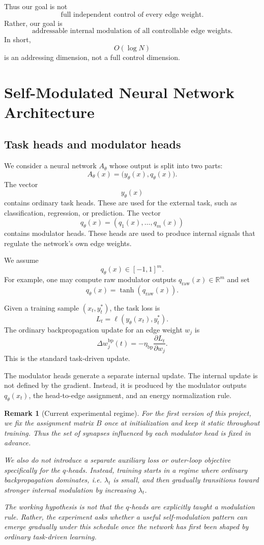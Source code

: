 \documentclass[11pt]{article}
\newtheorem{remark}{Remark}
\newcommand{\R}{\mathbb{R}}
\newcommand{\1}{\mathbf{1}}
\begin{document}
Thus our goal is not
\[
\text{full independent control of every edge weight}.
\]
Rather, our goal is
\[
\text{addressable internal modulation of all controllable edge weights}.
\]
In short,
\[
O(\log N)
\]
is an addressing dimension, not a full control dimension.

\section{Self-Modulated Neural Network Architecture}

\subsection{Task heads and modulator heads}

We consider a neural network \(A_\theta\) whose output is split into two parts:
\[
A_\theta(x)
=
\big(
y_\theta(x),q_\theta(x)
\big).
\]
The vector
\[
y_\theta(x)
\]
contains ordinary task heads. These are used for the external task, such as classification, regression, or prediction. The vector
\[
q_\theta(x)
=
(q_1(x),\dots,q_m(x))
\]
contains modulator heads. These heads are used to produce internal signals that regulate the network's own edge weights.

We assume
\[
q_\theta(x)\in[-1,1]^m.
\]
For example, one may compute raw modulator outputs \(q_{\mathrm{raw}}(x)\in\R^m\) and set
\[
q_\theta(x)=\tanh(q_{\mathrm{raw}}(x)).
\]

Given a training sample \((x_t,y_t^\ast)\), the task loss is
\[
L_t=\ell(y_\theta(x_t),y_t^\ast).
\]
The ordinary backpropagation update for an edge weight \(w_j\) is
\[
\Delta w_j^{\mathrm{bp}}(t)
=
-\eta_{\mathrm{bp}}
\frac{\partial L_t}{\partial w_j}.
\]
This is the standard task-driven update.

The modulator heads generate a separate internal update. The internal update is not defined by the gradient. Instead, it is produced by the modulator outputs \(q_\theta(x_t)\), the head-to-edge assignment, and an energy normalization rule.

\begin{remark}[Current experimental regime]
For the first version of this project, we fix the assignment matrix \(B\) once at initialization and keep it static throughout training. Thus the set of synapses influenced by each modulator head is fixed in advance.

We also do not introduce a separate auxiliary loss or outer-loop objective specifically for the \(q\)-heads. Instead, training starts in a regime where ordinary backpropagation dominates, i.e. \(\lambda_t\) is small, and then gradually transitions toward stronger internal modulation by increasing \(\lambda_t\).

The working hypothesis is not that the \(q\)-heads are explicitly taught a modulation rule. Rather, the experiment asks whether a useful self-modulation pattern can emerge gradually under this schedule once the network has first been shaped by ordinary task-driven learning.
\end{remark}
\end{document}
